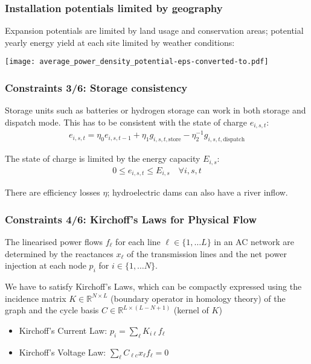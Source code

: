 \documentclass[10pt,aspectratio=169,dvipsnames]{beamer}
\newcommand{\R}{\mathbb{R}}
\let\olditem\item
\renewcommand{\item}{%
\olditem\vspace{5pt}}
\begin{document}
\begin{frame}
  \frametitle{Installation potentials limited by geography}

  Expansion potentials are limited by \alert{land usage} and
  \alert{conservation areas}; potential yearly energy yield at each site
  limited by \alert{weather conditions}:

  \centering
  \texttt{[image: average\_power\_density\_potential-eps-converted-to.pdf]}
\end{frame}




\begin{frame}
  \frametitle{Constraints 3/6: Storage consistency}

  Storage units such as batteries or hydrogen storage can work in both
  storage and dispatch mode. This has to be consistent with the state
  of charge $e_{i,s,t}$:
  \begin{align*}
    e_{i,s,t} = \eta_0e_{i,s,t-1} + \eta_1g_{i,s,t,\textrm{store}} -  \eta_2^{-1} g_{i,s,t,\textrm{dispatch}}
  \end{align*}

  The state of charge is limited by the energy capacity $E_{i,s}$:
  \begin{align*}
    0 \leq e_{i,s,t} \leq E_{i,s} \quad \forall i,s,t
  \end{align*}


  There are efficiency losses $\eta$; hydroelectric dams can also have a river inflow.

\end{frame}




\begin{frame}
  \frametitle{Constraints 4/6: Kirchoff's Laws for Physical Flow}

  The linearised \alert{power flows} $f_\ell$ for each line $\ell \in
  \{1,\dots L\}$ in an AC network are determined by the
  \alert{reactances} $x_\ell$ of the transmission lines and the
  \alert{net power injection} at each node $p_i$ for $i\in\{1,\dots
  N\}$.


  We have to satisfy Kirchoff's Laws, which can be compactly expressed
  using the \alert{incidence matrix} $K \in \R^{N\times L}$ (boundary
  operator in homology theory) of the graph and the \alert{cycle
    basis} $C \in \R^{L\times(L-N+1)}$ (kernel of $K$)

  \begin{itemize}
  \item  Kirchoff's Current Law: $p_i = \sum_{\ell} K_{i\ell} f_\ell$
  \item  Kirchoff's Voltage Law: $\sum_\ell C_{\ell c} x_\ell f_\ell = 0$
  \end{itemize}

\end{frame}
\end{document}
